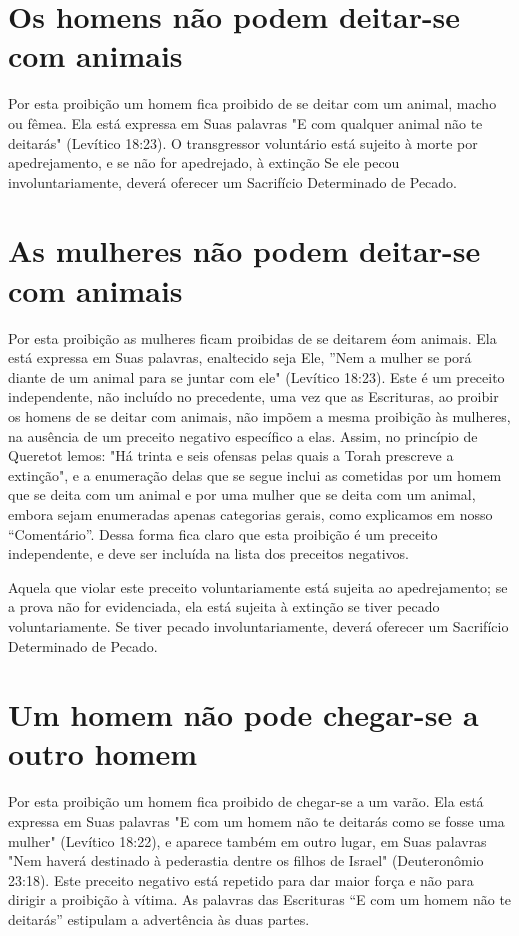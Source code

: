 \section{Os homens não podem deitar-se com animais}

Por esta proibição um homem fica proibido de se deitar com um ani­mal,
macho ou fêmea. Ela está expressa em Suas palavras "E com qualquer
ani­mal não te deitarás" (Levítico 18:23). O transgressor voluntário
está sujeito à morte por apedrejamento, e se não for apedrejado, à
extinção Se ele pecou involuntariamente, deverá oferecer um Sacrifício
Determinado de Pecado.

\section{As mulheres não podem deitar-se com animais}

Por esta proibição as mulheres ficam proibidas de se deitarem éom
animais. Ela está expressa em Suas palavras, enaltecido seja Ele, ''Nem
a mulher se porá diante de um animal para se juntar com ele" (Levítico
18:23). Este é um preceito independente, não incluído no precedente, uma
vez que as Escri­turas, ao proibir os homens de se deitar com animais,
não impõem a mesma proibição às mulheres, na ausência de um preceito
negativo específico a elas. Assim, no princípio de Queretot lemos: "Há
trinta e seis ofensas pelas quais a Torah prescreve a extinção", e a
enumeração delas que se segue inclui as co­metidas por um homem que se
deita com um animal e por uma mulher que se deita com um animal, embora
sejam enumeradas apenas categorias gerais, como explicamos em nosso
``Comentário''. Dessa forma fica claro que esta proi­bição é um preceito
independente, e deve ser incluída na lista dos preceitos negativos.

Aquela que violar este preceito voluntariamente está sujeita ao
ape­drejamento; se a prova não for evidenciada, ela está sujeita à
extinção se tiver pecado voluntariamente. Se tiver pecado
involuntariamente, deverá oferecer um Sacrifício Determinado de Pecado.

\section{Um homem não pode chegar-se a outro homem}

Por esta proibição um homem fica proibido de chegar-se a um va­rão. Ela
está expressa em Suas palavras "E com um homem não te deitarás co­mo se
fosse uma mulher" (Levítico 18:22), e aparece também em outro lugar, em
Suas palavras "Nem haverá destinado à pederastia dentre os filhos de
Is­rael" (Deuteronômio 23:18). Este preceito negativo está repetido para
dar maior força e não para dirigir a proibição à vítima. As palavras das
Escrituras ``E com um homem não te deitarás'' estipulam a advertência às
duas partes.

